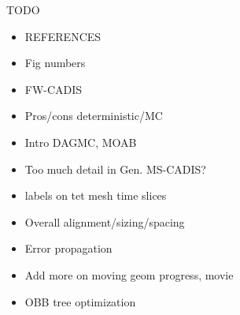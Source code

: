 \documentclass{beamer}
\begin{document}
\begin{frame}{TODO}
	\begin{itemize}
		\item{REFERENCES}
		\item{Fig numbers}
		\item{FW-CADIS}
		\item{Pros/cons deterministic/MC}
		\item{Intro DAGMC, MOAB}
		\item{Too much detail in Gen. MS-CADIS?}
		\item{labels on tet mesh time slices}
		\item{Overall alignment/sizing/spacing}
		\item{Error propagation}
		\item{Add more on moving geom progress, movie}
		\item{OBB tree optimization}
	\end{itemize}
\end{frame}
\end{document}
